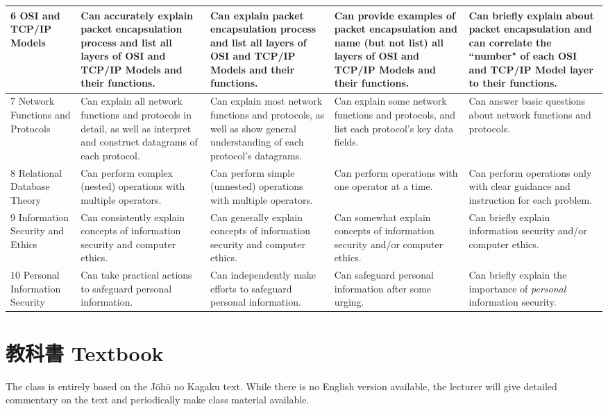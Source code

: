 \documentclass{article}
\begin{document}
\begin{landscape}
\begin{longtable}{|p{3.0cm}|p{4cm}|p{4cm}|p{4cm}|p{4cm}|}
\\
\hline
6 OSI and TCP/IP Models &
  Can accurately explain packet encapsulation process and list all layers of OSI and TCP/IP Models and their functions. &
  Can explain packet encapsulation process and list all layers of OSI and TCP/IP Models and their functions. &
  Can provide examples of packet encapsulation and name (but not list) all layers of OSI and TCP/IP Models and their functions. &
  Can briefly explain about packet encapsulation and can correlate the ``number" of each OSI and TCP/IP Model layer to their functions.
\\
\hline
7 Network Functions and Protocols &
  Can explain all network functions and protocols in detail, as well as interpret and construct datagrams of each protocol. &
  Can explain most network functions and protocols, as well as show general understanding of each protocol's datagrams. &
  Can explain some network functions and protocols, and list each protocol's key data fields. & 
  Can answer basic questions about network functions and protocols.
\\
\hline
8 Relational Database Theory &
  Can perform complex (nested) operations with multiple operators. &
  Can perform simple (unnested) operations with multiple operators. &
  Can perform operations with one operator at a time. &
  Can perform operations only with clear guidance and instruction for each problem.
\\
\hline
9 Information Security and Ethics &
  Can consistently explain concepts of information security and computer ethics. &
  Can generally explain concepts of information security and computer ethics. &
  Can somewhat explain concepts of information security and/or computer ethics. &
  Can briefly explain information security and/or computer ethics.
\\
\hline
10 Personal Information Security &
  Can take practical actions to safeguard personal information. &
  Can independently make efforts to safeguard personal information. &
  Can safeguard personal information after some urging. &
  Can briefly explain the importance of \textit{personal} information security.
\\
\hline

\end{longtable}

\end{landscape}

\section{教科書 Textbook}
The class is entirely based on the J\={o}h\={o} no Kagaku text. While there is no English version available, the lecturer will give detailed commentary on the text and periodically make class material available.
\end{document}
